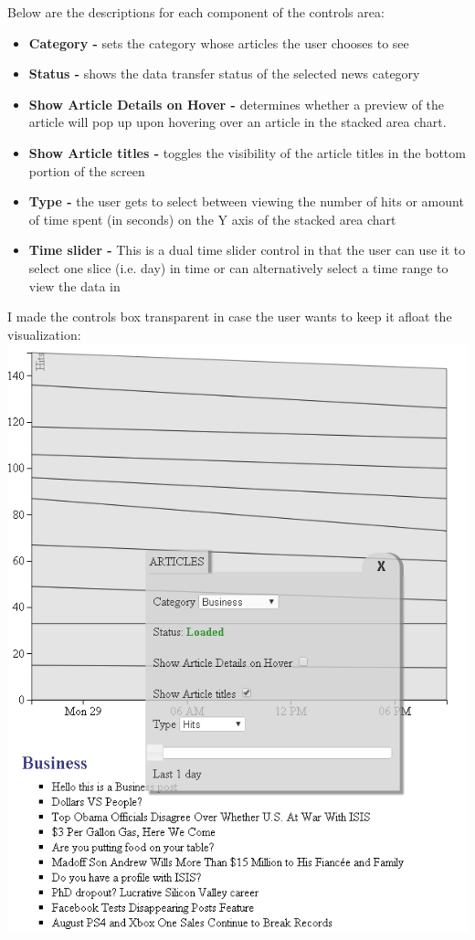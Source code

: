 \documentclass[12pt]{article}
\begin{document}
\noindent Below are the descriptions for each component of the controls area:

\begin{itemize}
\item \textbf{Category - } sets the category whose articles the user chooses to see
\item \textbf{Status - } shows the data transfer status of the selected news category
\item \textbf{Show Article Details on Hover - } determines whether a preview of the article will pop up upon hovering over an article in the stacked area chart. 
\item \textbf{Show Article titles - } toggles the visibility of the article titles in the bottom portion of the screen
\item \textbf{Type - } the user gets to select between viewing the number of hits or amount of time spent (in seconds) on the Y axis of the stacked area chart
\item \textbf{Time slider - } This is a dual time slider control in that the user can use it to select one slice (i.e. day) in time or can alternatively select a time range to view the data in 
\end{itemize}

\newpage

\noindent I made the controls box transparent in case the user wants to keep it afloat the visualization: \\

\noindent\includegraphics[scale=0.8]{img/viz_6}
\end{document}
